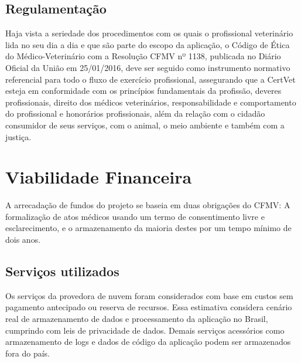 \documentclass[
    12pt,               %
    openright,          %
    oneside,
    a4paper,            %
    BIBLATEX,           %
    TODO,               %
    english,            %
    brazil              %
    ]{ifsp-spo-inf-ctds}
\begin{document}
        \subsection{Regulamentação}
        
            Haja vista a seriedade dos procedimentos com os quais o profissional veterinário lida no seu dia a dia e que são parte do escopo da aplicação, o Código de Ética do Médico-Veterinário com a Resolução CFMV nº 1138, publicada no Diário Oficial da União em 25/01/2016, deve ser seguido como instrumento normativo referencial para todo o fluxo de exercício profissional, assegurando que a CertVet esteja em conformidade com os princípios fundamentais da profissão, deveres profissionais, direito dos médicos veterinários, responsabilidade e comportamento do profissional e honorários profissionais, além da relação com o cidadão consumidor de seus serviços, com o animal, o meio ambiente e também com a justiça.  \cite{etica}

    \section{Viabilidade Financeira}
    
        A arrecadação de fundos do projeto se baseia em duas obrigações do CFMV: A formalização de atos médicos usando um termo de consentimento livre e esclarecimento, e o armazenamento da maioria destes por um tempo mínimo de dois anos.

        \subsection{Serviços utilizados}
        
            Os serviços da provedora de nuvem foram considerados com base em custos sem pagamento antecipado ou reserva de recursos. Essa estimativa considera cenário real de armazenamento de dados e processamento da aplicação no Brasil, cumprindo com leis de privacidade de dados. Demais serviços acessórios como armazenamento de logs e dados de código da aplicação podem ser armazenados fora do país.
\end{document}
